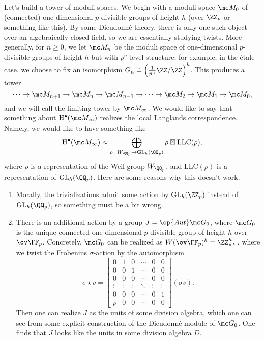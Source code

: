 \documentclass[../notes.tex]{subfiles}
\begin{document}
Let's build a tower of moduli spaces. We begin with a moduli space $\mc M_0$ of (connected) one-dimensional $p$-divisible groups of height $h$ (over $\ZZ_p$ or something like this). By some Dieudonn\'e theory, there is only one such object over an algebraically closed field, so we are essentially studying twists. More generally, for $n\ge0$, we let $\mc M_n$ be the moduli space of one-dimensional $p$-divisible groups of height $h$ but with $p^n$-level structure; for example, in the \'etale case, we choose to fix an isomorphism $G_n\cong\left(\frac1{p^n}\ZZ/\ZZ\right)^h$. This produces a tower
\[\cdots\to\mc M_{n+1}\to\mc M_n\to\mc M_{n-1}\to\cdots\to\mc M_2\to\mc M_1\to\mc M_0,\]
and we will call the limiting tower by $\mc M_\infty$. We would like to say that something about $\mathrm H^\bullet(\mc M_\infty)$ realizes the local Langlands correspondence. Namely, we would like to have something like
\[\mathrm H^\bullet(\mc M_\infty)\approx\bigoplus_{\rho\colon W_{\QQ_p}\to\mathrm{GL}_h(\QQ_p)}\rho\boxtimes\mathrm{LLC}(\rho),\]
where $\rho$ is a representation of the Weil group $W_{\QQ_p}$, and $\mathrm{LLC}(\rho)$ is a representation of $\mathrm{GL}_h(\QQ_p)$. Here are some reasons why this doesn't work.
\begin{enumerate}[label=(\roman*)]
	\item Morally, the trivializations admit some action by $\mathrm{GL}_h(\ZZ_p)$ instead of $\mathrm{GL}_h(\QQ_p)$, so something must be a bit wrong.
	\item There is an additional action by a group $J=\op{Aut}\mc G_0$, where $\mc G_0$ is the unique connected one-dimensional $p$-divisible group of height $h$ over $\ov\FF_p$. Concretely, $\mc G_0$ can be realized as $W(\ov\FF_p)^h=\ZZ_{p^\infty}^h$, where we twist the Frobenius $\sigma$-action by the automorphism
	\[\sigma\star v=\begin{bmatrix}
		0 & 1 & 0 & \cdots & 0 & 0 \\
		0 & 0 & 1 & \cdots & 0 & 0 \\
		0 & 0 & 0 & \cdots & 0 & 0 \\
		\vdots & \vdots & \vdots & \ddots & \vdots & \vdots \\
		0 & 0 & 0 & \cdots & 0 & 1 \\
		p & 0 & 0 & \cdots & 0 & 0
	\end{bmatrix}(\sigma v).\]
	Then one can realize $J$ as the units of some division algebra, which one can see from some explicit construction of the Dieudonn\'e module of $\mc G_0$. One finds that $J$ looks like the units in some division algebra $D$.
\end{enumerate}
\end{document}
